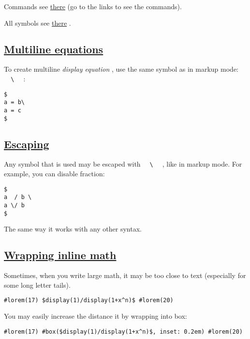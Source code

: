 Commands see
\href{https://typst.app/docs/reference/math/\#definitions}{there} (go to
the links to see the commands).

All symbols see
\href{https://typst.app/docs/reference/symbols/sym/}{there} .

\subsection{\texorpdfstring{\hyperref[multiline-equations]{Multiline
equations}}{Multiline equations}}\label{multiline-equations}

To create multiline \emph{display equation} , use the same symbol as in
markup mode: \texttt{\ }{\texttt{\ \textbackslash{}\ }}\texttt{\ } :

\begin{verbatim}
$
a = b\
a = c
$
\end{verbatim}

\pandocbounded{}

\subsection{\texorpdfstring{\hyperref[escaping]{Escaping}}{Escaping}}\label{escaping}

Any symbol that is used may be escaped with
\texttt{\ }{\texttt{\ \textbackslash{}\ }}\texttt{\ } , like in markup
mode. For example, you can disable fraction:

\begin{verbatim}
$
a  / b \
a \/ b
$
\end{verbatim}

\pandocbounded{}

The same way it works with any other syntax.

\subsection{\texorpdfstring{\hyperref[wrapping-inline-math]{Wrapping
inline math}}{Wrapping inline math}}\label{wrapping-inline-math}

Sometimes, when you write large math, it may be too close to text
(especially for some long letter tails).

\begin{verbatim}
#lorem(17) $display(1)/display(1+x^n)$ #lorem(20)
\end{verbatim}

\pandocbounded{}

You may easily increase the distance it by wrapping into box:

\begin{verbatim}
#lorem(17) #box($display(1)/display(1+x^n)$, inset: 0.2em) #lorem(20)
\end{verbatim}

\pandocbounded{}
